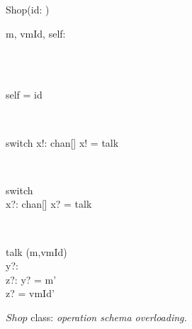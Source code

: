 \begin{figure}[H]
\centering
\begin{class}{Shop(id: \integer)}
\\
\begin{state}
m, vmId, self: \integer
\end{state} 
\\
\begin{init}
\\self = id
\end{init} 
\\
\begin{op}{switch}
x!: chan[\integer \times \integer]
\ST
x! = talk
\end{op}
\\
\begin{op}{switch}
\\x?: chan[\integer \times \integer]
\ST
x? = talk
\end{op}
\\
\begin{op}{talk}
\Delta (m,vmId)
\\y?: \integer
\\z?: \integer
\ST
y? = m'
\\z? = vmId'
\end{op}
\end{class}
\caption{$Shop$ class: \textit{operation schema overloading.}}
\label{fig_oz_overloaded_operation_shop}
\end{figure}